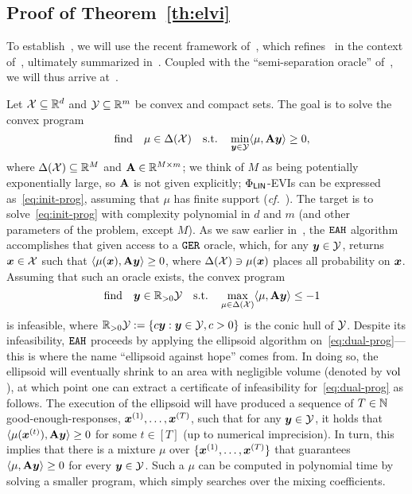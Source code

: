 \subsection{Proof of Theorem~\ref{th:elvi}}
\label{sec:mainproof}

To establish~, we will use the recent framework of~\citet{Daskalakis24:Efficient}, which refines~ in the context of~, ultimately summarized in~. Coupled with the ``semi-separation oracle'' of~, we will thus arrive at~.

Let ${\mathcal{X}} \subseteq \mathbb R^d$ and ${\mathcal{Y}} \subseteq \mathbb R^m$ be convex and compact sets. The goal is to solve the convex program
\begin{equation}
    \label{eq:init-prog}
    \qq{find} \mu \in \Delta(\cX) \qq{s.t.} \min_{\vy \in \cY} \langle \mu, \mat{A} \vy \rangle \geq 0,
\end{equation}
where $\Delta({\mathcal{X}}) \subseteq \mathbb R^M$ and $\mathbf{A} \in \mathbb R^{M \times m}$; we think of $M$ as being potentially exponentially large, so $\mathbf{A}$ is not given explicitly; $\Phi_\mathsf{LIN}$-EVIs can be expressed as~\eqref{eq:init-prog}, assuming that $\mu$ has finite support (\emph{cf.}~). The target is to solve~\eqref{eq:init-prog} with complexity polynomial in $d$ and $m$ (and other parameters of the problem, except $M$). As we saw earlier in~, the $\mathtt{EAH}$ algorithm accomplishes that given access to a $\mathtt{GER}$ oracle, which, for any ${\bm{y}} \in {\mathcal{Y}}$, returns ${\bm{x}} \in {\mathcal{X}}$ such that $\langle \mu({\bm{x}}), \mathbf{A} {\bm{y}} \rangle \geq 0$, where $\Delta({\mathcal{X}}) \ni \mu({\bm{x}})$ places all probability on ${\bm{x}}$. Assuming that such an oracle exists, the convex program
\begin{equation}
    \label{eq:dual-prog}
    \qq{find} \vy \in \R_{> 0} \cY \qq{s.t.} \max_{\mu \in \Delta(\cX)} \langle \mu, \mat{A} \vy \rangle \leq -1
\end{equation}
is infeasible, where $\mathbb R_{> 0} {\mathcal{Y}} := \{ c {\bm{y}} : {\bm{y}} \in {\mathcal{Y}}, c > 0 \}$ is the conic hull of ${\mathcal{Y}}$. Despite its infeasibility, $\mathtt{EAH}$ proceeds by applying the ellipsoid algorithm on~\eqref{eq:dual-prog}---this is where the name ``ellipsoid against hope'' comes from. In doing so, the ellipsoid will eventually shrink to an area with negligible volume (denoted by $\operatorname{vol}$), at which point one can extract a certificate of infeasibility for~\eqref{eq:dual-prog} as follows. The execution of the ellipsoid will have produced a sequence of $T \in \mathbb N$ good-enough-responses, ${\bm{x}}^{(1)}, \dots, {\bm{x}}^{(T)}$, such that for any ${\bm{y}} \in {\mathcal{Y}}$, it holds that $\langle \mu({\bm{x}}^{(t)}), \mathbf{A} {\bm{y}} \rangle \geq 0 $ for some $t \in [T]$ (up to numerical imprecision). In turn, this implies that there is a mixture $\mu$ over $\{ {\bm{x}}^{(1)}, \dots, {\bm{x}}^{(T)} \}$ that guarantees $\langle \mu, \mathbf{A} {\bm{y}} \rangle \geq 0$ for every ${\bm{y}} \in {\mathcal{Y}}$. Such a $\mu$ can be computed in polynomial time by solving a smaller program, which simply searches over the mixing coefficients.

